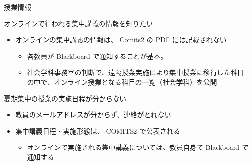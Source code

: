 \documentclass[a4j,10pt]{jsarticle}
\def\lthtmlcheckvsize{\ifdim\ht\sizebox<\vsize 
  \ifdim\wd\sizebox<\hsize\expandafter\hfill\fi \expandafter\vfill
  \else\expandafter\vss\fi}%
\begin{document}
{\begin{frame}[label={sec:orgfb54576},fragile]{授業情報}
\begin{block}{オンラインで行われる集中講義の情報を知りたい}
\begin{itemize}
\item オンラインの集中講義の情報は、 Comits2 の PDF には記載されない
\begin{itemize}
\item 各教員が Blackboard で通知することが基本。
\item 社会学科事務室の判断で、遠隔授業実施により集中授業に移行した科目の中で、オンライン授業となる科目の一覧（社会学科）を公開
\end{itemize}
\end{itemize}
\end{block}
\par
\begin{block}{夏期集中の授業の実施日程が分からない}
\begin{itemize}
\item 教員のメールアドレスが分からず、連絡がとれない
\item 集中講義日程・実施形態は、 COMITS2 で公表される
\begin{itemize}
\item オンラインで実施される集中講義については、教員自身で Blackboard で通知する
\end{itemize}
\end{itemize}
\end{block}
\end{frame}%
\lthtmlfigureZ
\lthtmlcheckvsize\clearpage}
\end{document}

